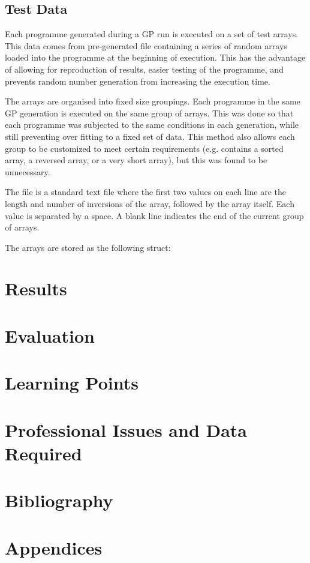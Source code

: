 \documentclass{article}
\begin{document}
		\subsection{Test Data}
		
			Each programme generated during a GP run is executed on a set of test arrays. This data comes from pre-generated file containing a series of random arrays loaded into the programme at the beginning of execution. This has the advantage of allowing for reproduction of results, easier testing of the programme, and prevents random number generation from increasing the execution time.
			
			The arrays are organised into fixed size groupings. Each programme in the same GP generation is executed on the same group of arrays. This was done so that each programme was subjected to the same conditions in each generation, while still preventing over fitting to a fixed set of data. This method also allows each group to be customized to meet certain requirements (e.g. contains a sorted array, a reversed array, or a very short array), but this was found to be unnecessary.
			
			The file is a standard text file where the first two values on each line are the length and number of inversions of the array, followed by the array itself. Each value is separated by a space. A blank line indicates the end of the current group of arrays.
			
			The arrays are stored as the following struct:
	
	\section{Results}
	
	\section{Evaluation}
	
	\section{Learning Points}
	
	\section{Professional Issues and Data Required}
	
	\section{Bibliography}
	
		
		
	
	\section{Appendices}
		
\end{document}
